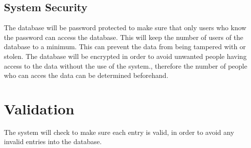 \subsection{System Security}

The database will be password protected to make sure that only users who know the password can access the database. This will keep the number of users of the database to a minimum. This can prevent the data from being tampered with or stolen. The database will be encrypted in order to avoid unwanted people having access to the data without the use of the system., therefore the number of people who can acces the data can be determined beforehand.

\section{Validation}

The system will check to make sure each entry is valid, in order to avoid any invalid entries into the database. 
 
